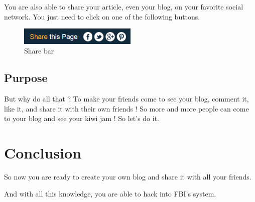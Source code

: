 \documentclass[a4paper,10pt]{article}
\begin{document}
You are also able to share your article, even your blog, on your favorite social network. You just need to click on one of the following buttons.

\begin{figure}[h]
    \center
  \includegraphics[width=0.5\textwidth]{Images/blogBar.png}
    \caption{Share bar}
\end{figure}

\subsection{Purpose}

But why do all that ? To make your friends come to see your blog, comment it, like it, and share it with their own friends ! So more and more people can come to your blog and see your kiwi jam ! So let's do it.

 


\newpage
\section{Conclusion}
So now you are ready to create your own blog and share it with all your friends.

And with all this knowledge, you are able to hack into FBI's system.
\end{document}
